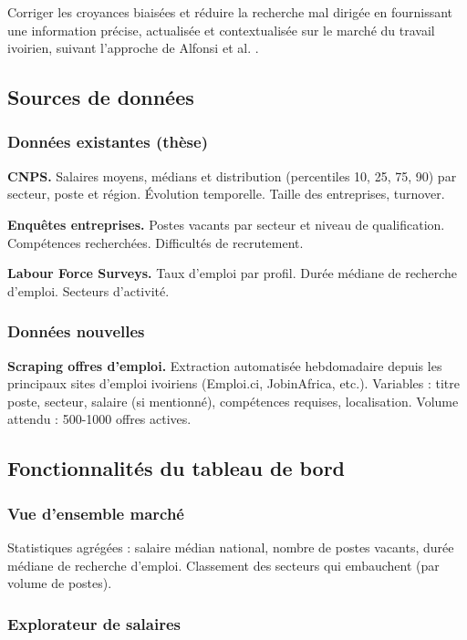 \documentclass[12pt]{article}
\begin{document}
Corriger les croyances biaisées et réduire la recherche mal dirigée en fournissant une information précise, actualisée et contextualisée sur le marché du travail ivoirien, suivant l'approche de Alfonsi et al. \citeyearpar{alfonsi2022}.

\subsection{Sources de données}

\subsubsection{Données existantes (thèse)}

\textbf{CNPS.} Salaires moyens, médians et distribution (percentiles 10, 25, 75, 90) par secteur, poste et région. Évolution temporelle. Taille des entreprises, turnover.

\textbf{Enquêtes entreprises.} Postes vacants par secteur et niveau de qualification. Compétences recherchées. Difficultés de recrutement.

\textbf{Labour Force Surveys.} Taux d'emploi par profil. Durée médiane de recherche d'emploi. Secteurs d'activité.

\subsubsection{Données nouvelles}

\textbf{Scraping offres d'emploi.} Extraction automatisée hebdomadaire depuis les principaux sites d'emploi ivoiriens (Emploi.ci, JobinAfrica, etc.). Variables : titre poste, secteur, salaire (si mentionné), compétences requises, localisation. Volume attendu : 500-1000 offres actives.

\subsection{Fonctionnalités du tableau de bord}

\subsubsection{Vue d'ensemble marché}

Statistiques agrégées : salaire médian national, nombre de postes vacants, durée médiane de recherche d'emploi. Classement des secteurs qui embauchent (par volume de postes).

\subsubsection{Explorateur de salaires}
\end{document}
